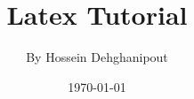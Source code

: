 \documentclass[a4paper,12pt]{book}
\begin{document}
\title{\Large{\textbf{Latex Tutorial}}}
\author{By Hossein Dehghanipout}
\date{\today}
\maketitle
\end{document}
